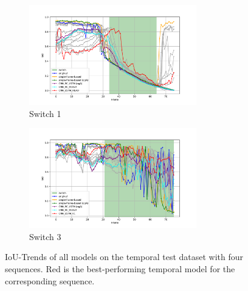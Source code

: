 \begin{figure}[H]
    \begin{subfigure}[b]{1\textwidth}
        \centering
        \includegraphics[width=0.8\textwidth]{PICs/experiments/temporalModels/plot_ious_sequence_1.pdf}
        \caption{Switch 1}
        \label{fig:IoUTrends_switch_1}
    \end{subfigure}
    \begin{subfigure}[b]{1\textwidth}
        \centering
        \includegraphics[width=0.8\textwidth]{PICs/experiments/temporalModels/plot_ious_sequence_3.pdf}
        \caption{Switch 3}
        \label{fig:IoUTrends_switch_3}
    \end{subfigure}

    \caption{\ac{IoU}-Trends of all models on the temporal test dataset with four sequences. Red is the best-performing temporal model for the corresponding sequence.}
    \label{fig:IoUTrends}
\end{figure}

